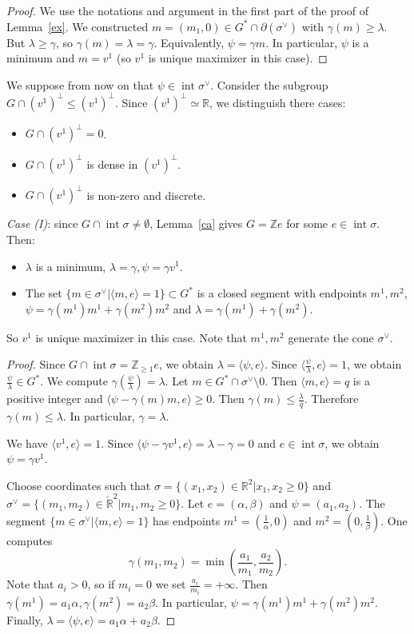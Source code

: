 \documentclass[12pt,reqno]{amsart}
\newcommand{\Z}{{\mathbb Z}}
\newcommand{\R}{{\mathbb R}}
\newcommand{\Int}{\operatorname{int}}
\theoremstyle{plain}
\theoremstyle{definition}
\theoremstyle{remark}
\begin{document}
\begin{proof} We use the notations and argument in the first part
of the proof of Lemma~\ref{ex}. We constructed 
$m=(m_1,0)\in G^*\cap \partial(\sigma^\vee)$ with $\gamma(m)\ge \lambda$.
But $\lambda\ge \gamma$, so $\gamma(m)=\lambda=\gamma$.
Equivalently, $\psi=\gamma m$. In particular, $\psi$ is a minimum
and $m=v^1$ (so $v^1$ is unique maximizer in this case).
\end{proof}

We suppose from now on that $\psi\in \Int \sigma^\vee$.
Consider the subgroup $G\cap (v^1)^\perp\le (v^1)^\perp$. 
Since $(v^1)^\perp\simeq \R$, we distinguish there cases:
\begin{itemize}
\item[(I)] $G\cap (v^1)^\perp=0$.
\item[(II)] $G\cap (v^1)^\perp$ is dense in $(v^1)^\perp$.
\item[(III)] $G\cap (v^1)^\perp$ is non-zero and discrete.
\end{itemize}

{\em Case (I)}: since $G\cap \Int\sigma \ne \emptyset$, Lemma~\ref{ca} 
gives $G=\Z e$ for some $e\in \Int \sigma$. Then:
\begin{itemize}
\item $\lambda$ is a minimum, $\lambda=\gamma, \psi=\gamma v^1$.
\item The set $\{m\in \sigma^\vee \vert \langle m,e\rangle=1\}\subset G^*$ is a closed segment with endpoints $m^1,m^2$, $\psi=\gamma(m^1)m^1+\gamma(m^2)m^2$ and $\lambda=\gamma(m^1)+\gamma(m^2)$.
\end{itemize}
So $v^1$ is unique maximizer in this case. Note that $m^1,m^2$ generate the cone $\sigma^\vee$.

\begin{proof} Since $G\cap \Int\sigma=\Z_{\ge 1}e$, we obtain
$\lambda=\langle \psi,e\rangle$.
Since $\langle \frac{\psi}{\lambda},e\rangle =1$, we obtain
$\frac{\psi}{\lambda}\in G^*$. We compute 
$\gamma(\frac{\psi}{\lambda})=\lambda$.
Let $m\in G^*\cap \sigma^\vee\setminus 0$. Then 
$\langle m,e\rangle=q$ is a positive integer and
$
\langle \psi-\gamma(m)m,e\rangle\ge 0.
$
Then $\gamma(m)\le \frac{\lambda}{q}$. Therefore
$\gamma(m)\le \lambda$. In particular, $\gamma=\lambda$.

We have $\langle v^1,e\rangle=1$. 
Since $\langle \psi-\gamma v^1,e\rangle=\lambda-\gamma=0$
and $e\in \Int \sigma$, we obtain $\psi=\gamma v^1$.

Choose coordinates such that $\sigma=\{(x_1,x_2)\in \R^2 \vert x_1,x_2\ge 0\}$
and $\sigma^\vee=\{(m_1,m_2)\in \check{\R}^2 \vert m_1,m_2\ge 0\}$. Let
$e=(\alpha,\beta)$ and $\psi=(a_1,a_2)$. The segment
$\{m\in \sigma^\vee \vert \langle m,e\rangle=1\}$ has endpoints $m^1=(\frac{1}{\alpha},0)$ and $m^2=(0,\frac{1}{\beta})$. One computes 
$$
\gamma(m_1,m_2)=\min(\frac{a_1}{m_1},\frac{a_2}{m_2}).
$$
Note that $a_i>0$, so if $m_i=0$ we set $\frac{a_i}{m_i}=+\infty$.
Then $\gamma(m^1)=a_1\alpha,\gamma(m^2)=a_2\beta$. In particular,
$\psi=\gamma(m^1)m^1+\gamma(m^2)m^2$. Finally,
$\lambda=\langle \psi,e\rangle=a_1\alpha+a_2\beta$.
\end{proof}
\end{document}
